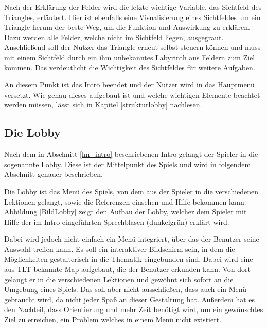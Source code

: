 Nach der Erklärung der Felder wird die letzte wichtige Variable, das Sichtfeld des Triangles, erläutert. Hier ist ebenfalls eine Visualisierung eines Sichtfeldes um ein Triangle herum der beste Weg, um die Funktion und Auswirkung zu erklären. Dazu werden alle Felder, welche nicht im Sichtfeld liegen, ausgegraut. Anschließend soll der Nutzer das Triangle erneut selbst steuern können und muss mit einem Sichtfeld durch ein ihm unbekanntes Labyrinth aus Feldern zum Ziel kommen. Das verdeutlicht die Wichtigkeit des Sichtfeldes für weitere Aufgaben.

An diesem Punkt ist das Intro beendet und der Nutzer wird in das Hauptmenü versetzt. Wie genau dieses aufgebaut ist und welche wichtigen Elemente beachtet werden müssen, lässt sich in Kapitel \ref{strukturlobby} nachlesen.

\subsection{Die Lobby}

Nach dem in Abschnitt \ref{lm_intro} beschriebenen Intro gelangt der Spieler in die sogenannte Lobby. Diese ist der Mittelpunkt des Spiels und wird in folgendem Abschnitt genauer beschrieben. 

Die Lobby ist das Menü des Spiels, von dem aus der Spieler in die verschiedenen Lektionen gelangt, sowie die Referenzen einsehen und Hilfe bekommen kann. Abbildung \ref{BildLobby} zeigt den Aufbau der Lobby, welcher dem Spieler mit Hilfe der im Intro eingeführten Sprechblasen (dunkelgrün) erklärt wird. 

Dabei wird jedoch nicht einfach ein Menü integriert, über das der Benutzer seine Auswahl treffen kann. Es soll ein interaktiver Bildschirm sein, in dem die Möglichkeiten gestalterisch in die Thematik eingebunden sind. Dabei wird eine aus TLT bekannte Map aufgebaut, die der Benutzer erkunden kann. Von dort gelangt er in die verschiedenen Lektionen und gewöhnt sich sofort an die Umgebung eines Spiels. Das soll aber nicht ausschließen, dass auch ein Menü gebraucht wird, da nicht jeder Spaß an dieser Gestaltung hat. Außerdem hat es den Nachteil, dass Orientierung und mehr Zeit benötigt wird, um ein gewünschtes Ziel zu erreichen, ein Problem welches in einem Menü nicht existiert.

